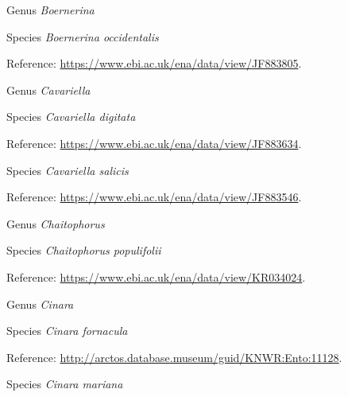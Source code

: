 \documentclass[9pt, article]{memoir}
\begin{document}
\begin{multicols}{2}
\vspace{6pt}\noindent\hspace{30pt}Genus \textit{Boernerina}


\vspace{6pt}\noindent\hspace{36pt}Species \textit{Boernerina occidentalis}


\vspace{6pt}Reference: 
\url{https://www.ebi.ac.uk/ena/data/view/JF883805}.

\vspace{6pt}\noindent\hspace{30pt}Genus \textit{Cavariella}


\vspace{6pt}\noindent\hspace{36pt}Species \textit{Cavariella digitata}


\vspace{6pt}Reference: 
\url{https://www.ebi.ac.uk/ena/data/view/JF883634}.

\vspace{6pt}\noindent\hspace{36pt}Species \textit{Cavariella salicis}


\vspace{6pt}Reference: 
\url{https://www.ebi.ac.uk/ena/data/view/JF883546}.

\vspace{6pt}\noindent\hspace{30pt}Genus \textit{Chaitophorus}


\vspace{6pt}\noindent\hspace{36pt}Species \textit{Chaitophorus populifolii}


\vspace{6pt}Reference: 
\url{https://www.ebi.ac.uk/ena/data/view/KR034024}.

\vspace{6pt}\noindent\hspace{30pt}Genus \textit{Cinara}


\vspace{6pt}\noindent\hspace{36pt}Species \textit{Cinara fornacula}


\vspace{6pt}Reference: 
\url{http://arctos.database.museum/guid/KNWR:Ento:11128}.

\vspace{6pt}\noindent\hspace{36pt}Species \textit{Cinara mariana}



\end{multicols}
\end{document}
